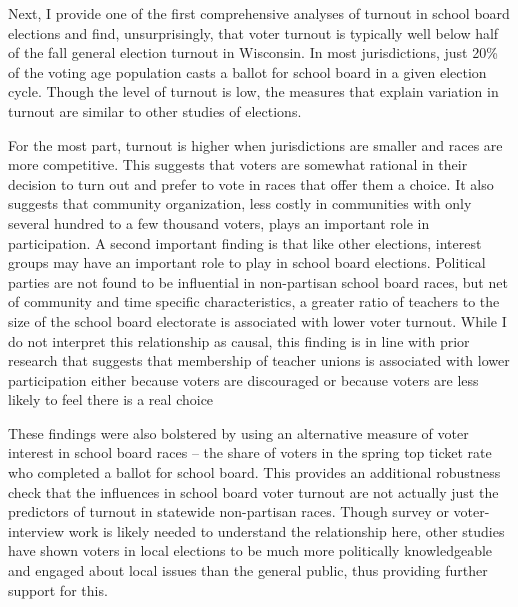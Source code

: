 Next, I provide one of the first comprehensive analyses of turnout in school 
board elections and find, unsurprisingly, that voter turnout is typically well 
below half of the fall general election turnout in Wisconsin. In most 
jurisdictions, just 20\% of the voting age population casts a ballot for school 
board in a given election cycle. Though the level of turnout is low, the measures 
that explain variation in turnout are similar to other studies of elections. 

For the most part, turnout is higher when jurisdictions are smaller and races are 
more competitive. This suggests that voters are somewhat rational in their 
decision to turn out and prefer to vote in races that offer them a choice. It 
also suggests that community organization, less costly in communities with only 
several hundred to a few thousand voters, plays an important role in participation. 
A second important finding is that like other elections, interest groups may have 
an important role to play in school board elections. Political parties are not 
found to be influential in non-partisan school board races, but net of community 
and time specific characteristics, a greater ratio of teachers to the size of the 
school board electorate is associated with lower voter turnout. While I do not 
interpret this relationship as causal, this finding is in line with prior 
research that suggests that membership of teacher unions is associated with lower 
participation either because voters are discouraged or because voters are less 
likely to feel there is a real choice %

These findings were also bolstered by using an alternative measure of voter 
interest in school board races -- the share of voters in the spring top ticket rate 
who completed a ballot for school board. This provides an additional robustness 
check that the influences in school board voter turnout are not actually just the 
predictors of turnout in statewide non-partisan races. Though survey or 
voter-interview work is likely needed to understand the relationship here, other 
studies have shown voters in local elections to be much more politically 
knowledgeable and engaged about local issues than the general public, thus 
providing further support for this. 

